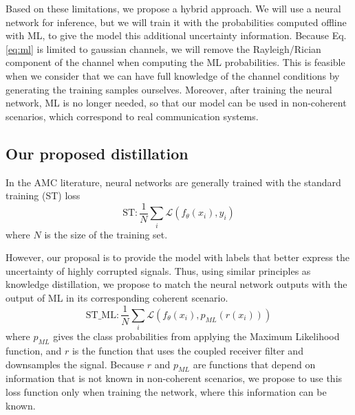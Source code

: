 \documentclass[conference]{IEEEtran}
\newcommand{\Ls}{\mathcal{L}}
\begin{document}
Based on these limitations, we propose a hybrid approach. We will use a neural network for inference, but we will train it with the probabilities computed offline with ML, to give the model this additional uncertainty information. Because Eq. \eqref{eq:ml} is limited to gaussian channels, we will remove the Rayleigh/Rician component of the channel when computing the ML probabilities. This is feasible when we consider that we can have full knowledge of the channel conditions by generating the training samples ourselves. Moreover, after training the neural network, ML is no longer needed, so that our model can be used in non-coherent scenarios, which correspond to real communication systems.


\subsection{Our proposed distillation}

In the AMC literature, neural networks are generally trained with the standard training (ST) loss
\begin{equation}
    \text{ST} : \dfrac{1}{N}\sum_{i}\Ls(f_{\theta}(x_i), y_i)
\end{equation}
where $N$ is the size of the training set.

However, our proposal is to provide the model with labels that better express the uncertainty of highly corrupted signals. Thus, using similar principles as knowledge distillation, we propose to match the neural network outputs with the output of ML in its corresponding coherent scenario.
\begin{equation}
    \text{ST\_ML} : \dfrac{1}{N}\sum_{i}\Ls(f_{\theta}(x_i), p_{ML}(r(x_i)))
\label{eq:st_ml}
\end{equation}
where $p_{ML}$ gives the class probabilities from applying the Maximum Likelihood function, and $r$ is the function that uses the coupled receiver filter and downsamples the signal. Because $r$ and $p_{ML}$ are functions that depend on information that is not known in non-coherent scenarios, we propose to use this loss function only when training the network, where this information can be known.
\end{document}
